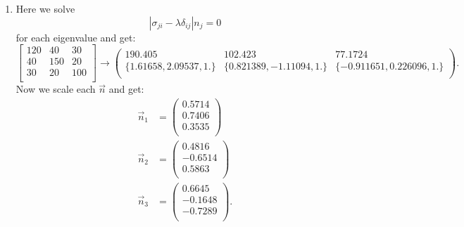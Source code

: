 \begin{derivation}
\begin{enumerate}[label=(\alph*)]
    \item Here we solve
      \begin{equation*}
        \left| \sigma_{ji} - \lambda \delta_{ij} \right| n_j = 0
      \end{equation*}
      for each eigenvalue and get:
      \begin{equation*}
        \begin{bmatrix}
          120 & 40 & 30\\
        40 & 150 & 20\\
        30 & 20 & 100\\
        \end{bmatrix} \rightarrow \left(
\begin{array}{ccc}
 190.405 & 102.423 & 77.1724 \\
 \{1.61658,2.09537,1.\} & \{0.821389,-1.11094,1.\} & \{-0.911651,0.226096,1.\} \\
\end{array}
\right)
      .\end{equation*}
      Now we scale each $\Vec{n}$ and get:
      \begin{align*}
        \Vec{n}_1 &= \begin{pmatrix}
          \num{0,5714} \\
        \num{0,7406} \\
        \num{0,3535} \\
        \end{pmatrix} \\
        \Vec{n}_2 &= \begin{pmatrix}
          \num{0,4816} \\
        -\num{0,6514} \\
        \num{0,5863} \\
        \end{pmatrix} \\
        \Vec{n}_3 &= \begin{pmatrix}
          \num{0,6645} \\
        -\num{0,1648} \\
        - \num{0,7289} \\
        \end{pmatrix}
      .\end{align*}
  \end{enumerate}
\end{derivation}

